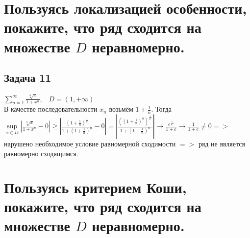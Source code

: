 \documentclass[a4paper, fleqn]{article}
\begin{document}
    
    
    \section*{Пользуясь локализацией особенности, покажите, что ряд сходится на множестве $D$ неравномерно.}
    \subsection*{Задача 11}
    $\sum\limits_{n = 1}^{\infty} \frac{\sqrt[n]{x}}{1 + x^n}, \; \; \; D = (1, +\infty)$ \\
    В качестве последовательности $x_n$ возьмём $1 + \frac{1}{n}$. Тогда \\
    $\sup\limits_{x \in D} \left| \frac{\sqrt[n]{x}}{1 + x^n} - 0 \right| \geq \left| \frac{(1 + \frac{1}{n})^{\frac{1}{n}}}{1 + (1 + \frac{1}{n})^n} - 0 \right| = \left| \frac{((1 + \frac{1}{n})^n)^{\frac{1}{n^2}}}{1 + (1 + \frac{1}{n})^n} \right| \rightarrow \frac{e^{\frac{1}{n^2}}}{1 + e} \rightarrow \frac{1}{1 + e} \neq 0 =>$ нарушено необходимое условие равномерной сходимости $=>$ ряд не является равномерно сходящимся. \\
    
    
    
    
    \section*{Пользуясь критерием Коши, покажите, что ряд сходится на множестве $D$ неравномерно.}
\end{document}
